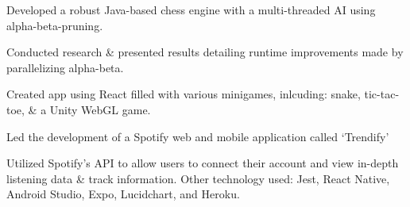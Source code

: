 \documentclass[]{deedy-resume-openfont}
\begin{document}
\begin{tightemize}
\item Developed a robust Java-based chess engine with a multi-threaded AI using alpha-beta-pruning. 
\item Conducted research \& presented results detailing runtime improvements made by parallelizing alpha-beta.
\end{tightemize}
\sectionsep

\begin{tightemize}
\item Created app using React filled with various minigames, inlcuding: snake, tic-tac-toe, \& a Unity WebGL game.
\end{tightemize}
\sectionsep

\begin{tightemize}
\item Led the development of a Spotify web and mobile application called ‘Trendify’
\item Utilized Spotify’s API to allow users to connect their account and view in-depth listening data \& track information. Other technology used: Jest, React Native, Android Studio, Expo, Lucidchart, and Heroku.
\end{tightemize}





\sectionsep\

\hfill
\end{document}
